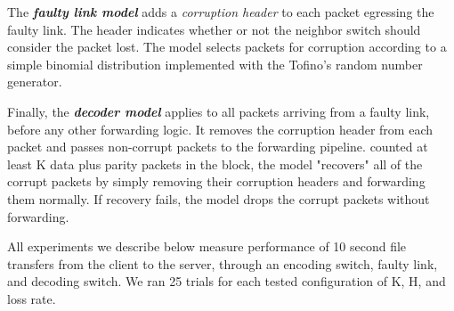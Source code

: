 The \textbf{\em faulty link model} adds a \emph{corruption header} to each packet
egressing the faulty link. The header indicates whether or not the neighbor
switch should consider the packet lost. The model selects packets for
corruption according to a simple binomial distribution implemented with the
Tofino's random number generator.

Finally, the \textbf{\em decoder model} applies to all packets arriving from a
faulty link, before any other forwarding logic. It removes the corruption
header from each packet and passes non-corrupt packets to the forwarding
pipeline.
counted at least K data plus parity packets  in the block, the model
"recovers" all of the corrupt packets by simply removing their corruption
headers and forwarding them normally. If recovery fails, the model drops the
corrupt packets without forwarding.

All experiments we describe below measure performance of 10 second file
transfers from the client to the server, through an encoding switch, faulty
link, and decoding switch. We ran 25 trials for each tested configuration of
K, H,  and loss rate.


